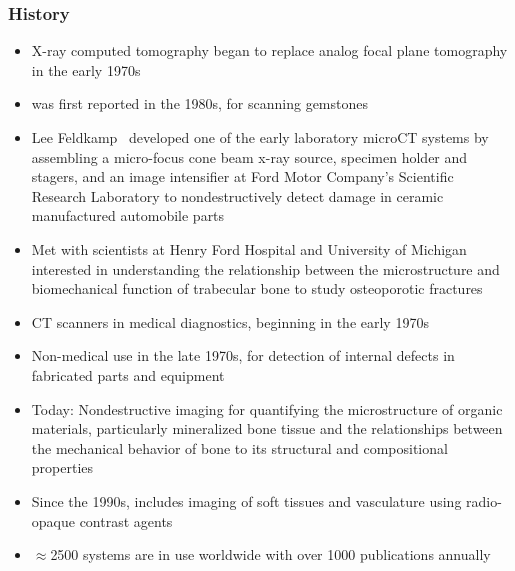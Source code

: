 \begin{frame}[allowframebreaks]
	\frametitle{\uct History}
			\begin{itemize}
				\item X-ray computed tomography began to replace analog focal plane tomography in the early 1970s~\cite{Lin2019}
				\item \uct was first reported in the 1980s, for scanning gemstones
				\item Lee Feldkamp~\cite{Feldkamp1984} developed one of the early laboratory microCT systems by assembling a micro-focus cone beam x-ray source, specimen holder and stagers, and an image intensifier at Ford Motor Company’s Scientific Research Laboratory to nondestructively detect damage in ceramic manufactured automobile parts
				\item Met with scientists at Henry Ford Hospital and University of Michigan interested in understanding the relationship between the microstructure and biomechanical function of trabecular bone to study osteoporotic fractures~\cite{Feldkamp1983}
				\item CT scanners in medical diagnostics, beginning in the early 1970s
				\item Non-medical use in the late 1970s, for detection of internal defects in fabricated parts and equipment
				\item Today: Nondestructive imaging for quantifying the microstructure of organic materials, particularly mineralized bone tissue and the relationships between the mechanical behavior of bone to its structural and compositional properties
				\item Since the 1990s, \uct includes imaging of soft tissues and vasculature using radio-opaque contrast agents
				\item \(\approx\)2500 \uct systems are in use worldwide with over 1000 publications annually
			\end{itemize}
\end{frame}

